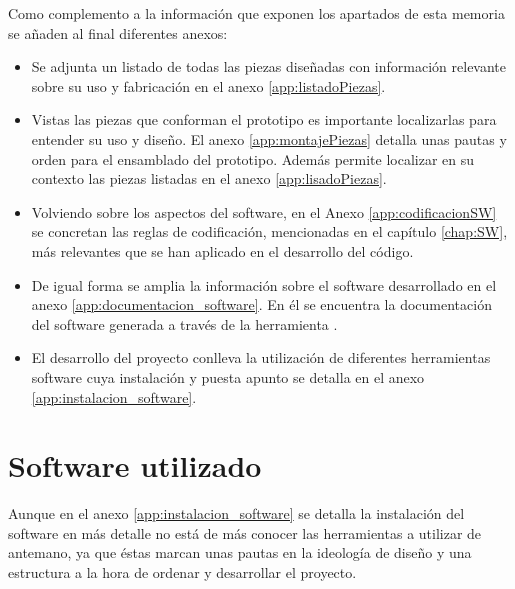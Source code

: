 Como complemento a la información que exponen los apartados de esta memoria se añaden al final diferentes anexos:

\begin{itemize}
    \item Se adjunta un listado de todas las piezas diseñadas con información relevante sobre su uso y fabricación en el anexo \ref{app:listadoPiezas}.
    \item Vistas las piezas que conforman el prototipo es importante localizarlas para entender su uso y diseño. El anexo \ref{app:montajePiezas} detalla unas pautas y orden para el ensamblado del prototipo. Además permite localizar en su contexto las piezas listadas en el anexo \ref{app:lisadoPiezas}.
    \item Volviendo sobre los aspectos del software, en el Anexo \ref{app:codificacionSW} se concretan las reglas de codificación, mencionadas en el capítulo \ref{chap:SW}, más relevantes que se han aplicado en el desarrollo del código.
    \item De igual forma se amplia la información sobre el software desarrollado en el anexo \ref{app:documentacion_software}. En él se encuentra la documentación del software generada a través de la herramienta .
    \item El desarrollo del proyecto conlleva la utilización de diferentes herramientas software cuya instalación y puesta apunto se detalla en el anexo \ref{app:instalacion_software}.
\end{itemize}

\section{Software utilizado}

Aunque en el anexo \ref{app:instalacion_software} se detalla la instalación del software en más detalle no está de más conocer las herramientas a utilizar de antemano, ya que éstas marcan unas pautas en la ideología de diseño y una estructura a la hora de ordenar y desarrollar el proyecto.

